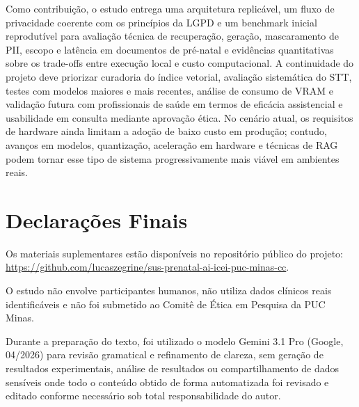 \documentclass[12pt]{article}
\begin{document}
Como contribuição, o estudo entrega uma arquitetura replicável, um fluxo de privacidade coerente com os princípios da LGPD e um benchmark inicial reprodutível para avaliação técnica de recuperação, geração, mascaramento de PII, escopo e latência em documentos de pré-natal e evidências quantitativas sobre os trade-offs entre execução local e custo computacional.
A continuidade do projeto deve priorizar curadoria do índice vetorial, avaliação sistemática do STT, testes com modelos maiores e mais recentes, análise de consumo de VRAM e validação futura com profissionais de saúde em termos de eficácia assistencial e usabilidade em consulta mediante aprovação ética.
No cenário atual, os requisitos de hardware ainda limitam a adoção de baixo custo em produção; contudo, avanços em modelos, quantização, aceleração em hardware e técnicas de RAG podem tornar esse tipo de sistema progressivamente mais viável em ambientes reais.


\section{Declarações Finais}

Os materiais suplementares estão disponíveis no repositório público do projeto: \url{https://github.com/lucaszegrine/sus-prenatal-ai-icei-puc-minas-cc}. 

O estudo não envolve participantes humanos, não utiliza dados clínicos reais identificáveis e não foi submetido ao Comitê de Ética em Pesquisa da PUC Minas. 

Durante a preparação do texto, foi utilizado o modelo Gemini 3.1 Pro (Google, 04/2026) para revisão gramatical e refinamento de clareza, sem geração de resultados experimentais, análise de resultados ou compartilhamento de dados sensíveis onde todo o conteúdo obtido de forma automatizada foi revisado e editado conforme necessário sob total responsabilidade do autor.



\end{document}

